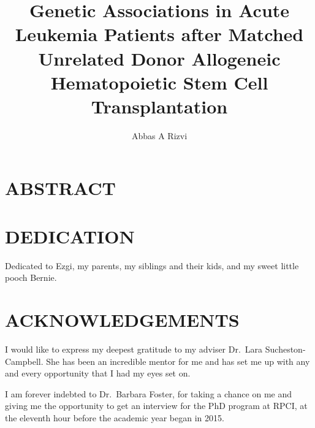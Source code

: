 \documentclass[]{DissertateOSU}
\title{Genetic Associations in Acute Leukemia Patients after Matched Unrelated
Donor Allogeneic Hematopoietic Stem Cell Transplantation}
\author{Abbas A Rizvi}
\date{}
\begin{document}
\maketitle

 \pagestyle{empty} \copyrightpage

\newpage

\pagestyle{plain} \fancyhead[L]{} \fancyhead[R]{}
\fancyfoot[C]{\thepage} \chapter*{ABSTRACT}


\newpage

\pagestyle{plain} \fancyhead[L]{} \fancyhead[R]{} \fancyfoot[C]{}
\chapter*{DEDICATION} 

Dedicated to Ezgi, my parents, my siblings and their kids, and my sweet
little pooch Bernie.

\newpage

\pagestyle{plain} \fancyhead[L]{} \fancyhead[R]{}
\fancyfoot[C]{\thepage} \chapter*{ACKNOWLEDGEMENTS}

\doublespacing

I would like to express my deepest gratitude to my adviser Dr.~Lara
Sucheston-Campbell. She has been an incredible mentor for me and has set
me up with any and every opportunity that I had my eyes set on.

I am forever indebted to Dr.~Barbara Foster, for taking a chance on me
and giving me the opportunity to get an interview for the PhD program at
RPCI, at the eleventh hour before the academic year began in 2015.
\end{document}
